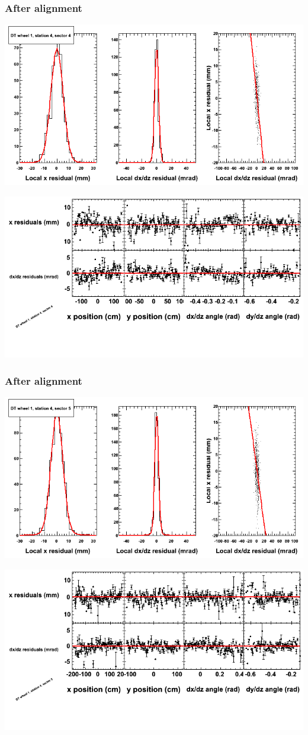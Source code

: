 \documentclass[compress]{beamer}
\begin{document}
\begin{frame}
\frametitle{After alignment}
\includegraphics[width=0.7\linewidth]{NOV4_fitfunctions/MBwhDst4sec04_bellcurves.png}

\includegraphics[width=0.7\linewidth]{NOV4_fitfunctions/MBwhDst4sec04_polynomials.png}
\end{frame}

\begin{frame}
\frametitle{After alignment}
\includegraphics[width=0.7\linewidth]{NOV4_fitfunctions/MBwhDst4sec05_bellcurves.png}

\includegraphics[width=0.7\linewidth]{NOV4_fitfunctions/MBwhDst4sec05_polynomials.png}
\end{frame}
\end{document}
